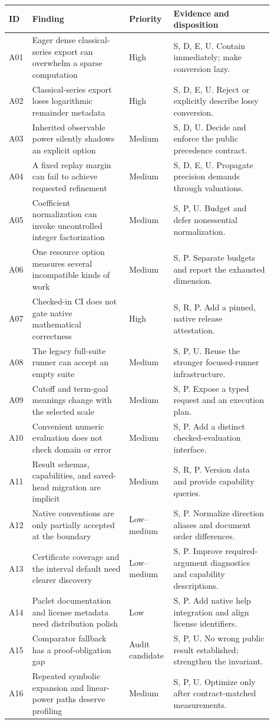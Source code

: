 \documentclass[11pt,a4paper]{article}
\newcommand{\code}[1]{\texttt{\detokenize{#1}}}
\begin{document}
\begin{longtable}{@{}P{0.065\linewidth}P{0.35\linewidth}P{0.12\linewidth}P{0.36\linewidth}@{}}
\toprule
ID & Finding & Priority & Evidence and disposition\\\midrule
\endhead
A01 & Eager dense classical-series export can overwhelm a sparse computation
& High & S, D, E, U. Contain immediately; make conversion lazy.\\
A02 & Classical-series export loses logarithmic remainder metadata
& High & S, D, E, U. Reject or explicitly describe lossy conversion.\\
A03 & Inherited observable power silently shadows an explicit option
& Medium & S, D, U. Decide and enforce the public precedence contract.\\
A04 & A fixed replay margin can fail to achieve requested refinement
& Medium & S, D, E, U. Propagate precision demands through valuations.\\
A05 & Coefficient normalization can invoke uncontrolled integer factorization
& Medium & S, P, U. Budget and defer nonessential normalization.\\
A06 & One resource option measures several incompatible kinds of work
& Medium & S, P. Separate budgets and report the exhausted dimension.\\
A07 & Checked-in CI does not gate native mathematical correctness
& High & S, R, P. Add a pinned, native release attestation.\\
A08 & The legacy full-suite runner can accept an empty suite
& Medium & S, P, U. Reuse the stronger focused-runner infrastructure.\\
A09 & Cutoff and term-goal meanings change with the selected scale
& Medium & S, P. Expose a typed request and an execution plan.\\
A10 & Convenient numeric evaluation does not check domain or error
& Medium & S, P. Add a distinct checked-evaluation interface.\\
A11 & Result schemas, capabilities, and saved-head migration are implicit
& Medium & S, R, P. Version data and provide capability queries.\\
A12 & Native conventions are only partially accepted at the boundary
& Low--medium & S, P. Normalize direction aliases and document order differences.\\
A13 & Certificate coverage and the \code{Automatic} interval default need clearer discovery
& Low--medium & S, P. Improve required-argument diagnostics and capability descriptions.\\
A14 & Paclet documentation and license metadata need distribution polish
& Low & S, P. Add native help integration and align license identifiers.\\
A15 & Comparator fallback has a proof-obligation gap
& Audit candidate & S, P, U. No wrong public result established; strengthen the invariant.\\
A16 & Repeated symbolic expansion and linear-power paths deserve profiling
& Medium & S, P, U. Optimize only after contract-matched measurements.\\
\bottomrule
\end{longtable}
\end{document}
